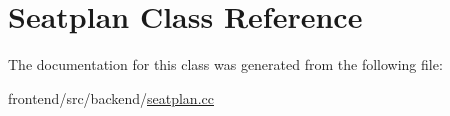 \hypertarget{classSeatplan}{\section{Seatplan Class Reference}
\label{classSeatplan}
}


The documentation for this class was generated from the following file\-:\begin{DoxyCompactItemize}
\item 
frontend/src/backend/\hyperlink{seatplan_8cc}{seatplan.\-cc}\end{DoxyCompactItemize}
